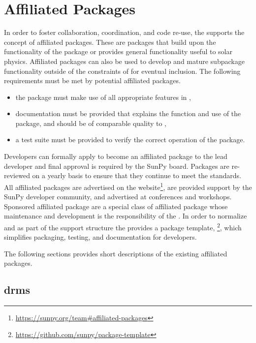 \section{Affiliated Packages}
\label{sec:affil_package}

In order to foster collaboration, coordination, and code re-use, the \sunpyproj supports the concept of affiliated packages.
These are \python packages that build upon the functionality of the \sunpypkg package or provides general functionality useful to solar physics.
Affiliated packages can also be used to develop and mature subpackage functionality outside of the constraints of \sunpypkg for eventual inclusion.
The following requirements must be met by potential affiliated packages.
\begin{itemize}
    \item the package must make use of all appropriate features in \sunpypkg,
    \item documentation must be provided that explains the function and use of the package, and should be of comparable quality to \sunpypkg,
    \item a test suite must be provided to verify the correct operation of the package.
\end{itemize}
Developers can formally apply to become an affiliated package to the lead developer and final approval is required by the SunPy board.
Packages are re-reviewed on a yearly basis to ensure that they continue to meet the standards.
All affiliated packages are advertised on the website\footnote{\url{https://sunpy.org/team\#affiliated-packages}}, are provided support by the SunPy developer community, and advertised at conferences and workshops.
Sponsored affiliated package are a special class of affiliated package whose maintenance and development is the responsibility of the \sunpyproj.
In order to normalize and as part of the support structure the \sunpyproj provides a package template, \footnote{\url{https://github.com/sunpy/package-template}}, which simplifies packaging, testing, and documentation for developers.

The following sections provides short descriptions of the existing affiliated packages.

\subsection{drms}
\label{sec:drms}

